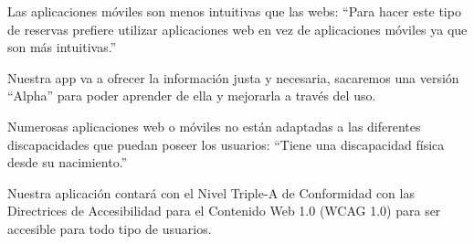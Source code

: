     \begin{problema}

    Las aplicaciones móviles son menos intuitivas que las webs: ``Para hacer este tipo de reservas prefiere utilizar aplicaciones web en vez de aplicaciones móviles ya que son más intuitivas.''

    {\centering\begin{vision}
    Nuestra app va a ofrecer la información justa y necesaria, sacaremos una versión ``Alpha'' para poder aprender de ella y mejorarla a través del uso.
    \end{vision}}
    \end{problema}

    \begin{problema}

        Numerosas aplicaciones web o móviles no están adaptadas a las diferentes discapacidades que puedan poseer los usuarios: ``Tiene una discapacidad física desde su nacimiento.''
    
        {\centering\begin{vision}
        Nuestra aplicación contará con el Nivel Triple-A de Conformidad con las Directrices de Accesibilidad para el Contenido Web 1.0 (WCAG 1.0) para ser accesible para todo tipo de usuarios.
        \end{vision}}
        \end{problema}
    


    
    
    
